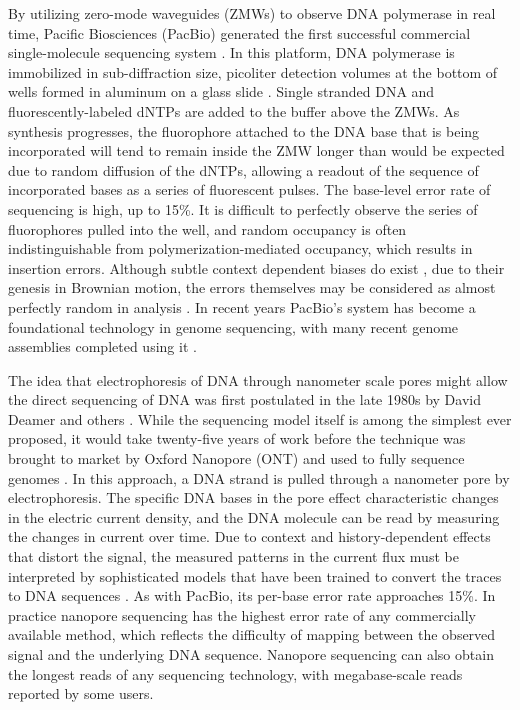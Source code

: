 By utilizing zero-mode waveguides (ZMWs) to observe DNA polymerase in real time, Pacific Biosciences (PacBio) generated the first successful commercial single-molecule sequencing system \cite{eid2009real}.
In this platform, DNA polymerase is immobilized in sub-diffraction size, picoliter detection volumes at the bottom of wells formed in aluminum on a glass slide \cite{korlach2008selective}.
Single stranded DNA and fluorescently-labeled dNTPs are added to the buffer above the ZMWs.
As synthesis progresses, the fluorophore attached to the DNA base that is being incorporated will tend to remain inside the ZMW longer than would be expected due to random diffusion of the dNTPs, allowing a readout of the sequence of incorporated bases as a series of fluorescent pulses.
The base-level error rate of sequencing is high, up to 15\%.
It is difficult to perfectly observe the series of fluorophores pulled into the well, and random occupancy is often indistinguishable from polymerization-mediated occupancy, which results in insertion errors.
Although subtle context dependent biases do exist \cite{ono2012pbsim}, due to their genesis in Brownian motion, the errors themselves may be considered as almost perfectly random in analysis \cite{ross2013characterizing,myers2014efficient}.
In recent years PacBio's system has become a foundational technology in genome sequencing, with many recent genome assemblies completed using it \cite{rhoads2015pacbio}.

The idea that electrophoresis of DNA through nanometer scale pores might allow the direct sequencing of DNA was first postulated in the late 1980s by David Deamer and others \cite{deamer2016three}.
While the sequencing model itself is among the simplest ever proposed, it would take twenty-five years of work \cite{kasianowicz1996characterization,purnell2008nucleotide} before the technique was brought to market by Oxford Nanopore (ONT) \cite{mikheyev2014first} and used to fully sequence genomes \cite{loman2015complete, jain2018nanopore}.
In this approach, a DNA strand is pulled through a nanometer pore by electrophoresis.
The specific DNA bases in the pore effect characteristic changes in the electric current density, and the DNA molecule can be read by measuring the changes in current over time.
Due to context and history-dependent effects that distort the signal, the measured patterns in the current flux must be interpreted by sophisticated models that have been trained to convert the traces to DNA sequences \cite{david2016nanocall}.
As with PacBio, its per-base error rate approaches 15\%.
In practice nanopore sequencing has the highest error rate of any commercially available method, which reflects the difficulty of mapping between the observed signal and the underlying DNA sequence.
Nanopore sequencing can also obtain the longest reads of any sequencing technology, with megabase-scale reads reported by some users.

